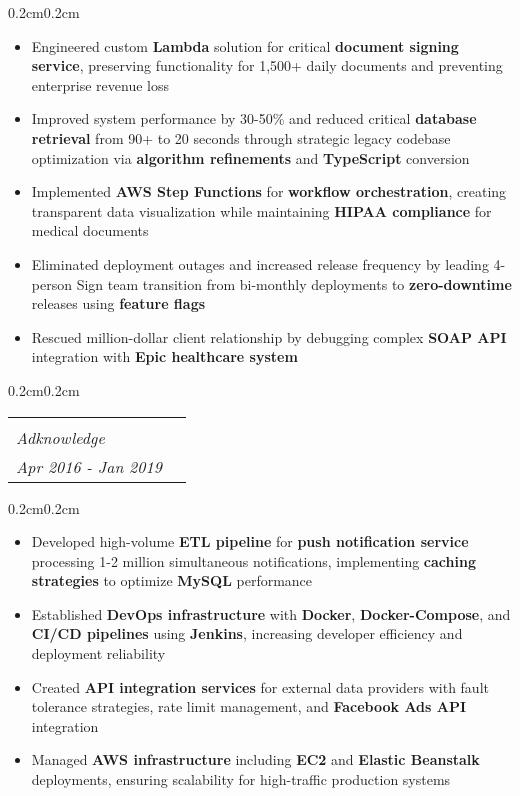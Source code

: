 \documentclass[10pt, letterpaper]{article}
\makeatletter
\newenvironment{highlights}{
    \begin{itemize}[
        topsep=0.10 cm,
        parsep=0.10 cm,
        partopsep=0pt,
        itemsep=0pt,
        leftmargin=0.4 cm + 10pt
    ]
}{
    \end{itemize}
}
\newenvironment{onecolentry}{
    \begin{adjustwidth}{0.2cm}{0.2cm}
}{
    \end{adjustwidth}
}
\newcommand{\jobentry}[4]{
    \begin{onecolentry}
        \noindent
        \begin{tabularx}{\textwidth}{@{}X>{\raggedleft\arraybackslash}p{3cm}@{\hspace{0.2cm}}}
            \begin{tabular}[t]{@{}l@{}}
                \textbf{#1}\\
                \textit{#2}
            \end{tabular} &
            \begin{tabular}[t]{@{}r@{}}
                #4\\
                \textit{#3}
            \end{tabular}
        \end{tabularx}
    \end{onecolentry}
}
\makeatother
\begin{document}
    \vspace{0.10cm}
    \begin{onecolentry}
        \begin{highlights}
            \item Engineered custom \textbf{Lambda} solution for critical \textbf{document signing service}, preserving functionality for 1,500+ daily documents and preventing enterprise revenue loss
            \item Improved system performance by 30-50\% and reduced critical \textbf{database retrieval} from 90+ to 20 seconds through strategic legacy codebase optimization via \textbf{algorithm refinements} and \textbf{TypeScript} conversion
            \item Implemented \textbf{AWS Step Functions} for \textbf{workflow orchestration}, creating transparent data visualization while maintaining \textbf{HIPAA compliance} for medical documents
            \item Eliminated deployment outages and increased release frequency by leading 4-person Sign team transition from bi-monthly deployments to \textbf{zero-downtime} releases using \textbf{feature flags}
            \item Rescued million-dollar client relationship by debugging complex \textbf{SOAP API} integration with \textbf{Epic healthcare system}
        \end{highlights}
    \end{onecolentry}

    \vspace{0.3cm}

    \jobentry{Java Backend Developer}{Adknowledge}{Apr 2016 - Jan 2019}{Kansas City, MO}

    \vspace{0.10cm}
    \begin{onecolentry}
        \begin{highlights}
            \item Developed high-volume \textbf{ETL pipeline} for \textbf{push notification service} processing 1-2 million simultaneous notifications, implementing \textbf{caching strategies} to optimize \textbf{MySQL} performance
            \item Established \textbf{DevOps infrastructure} with \textbf{Docker}, \textbf{Docker-Compose}, and \textbf{CI/CD pipelines} using \textbf{Jenkins}, increasing developer efficiency and deployment reliability
            \item Created \textbf{API integration services} for external data providers with fault tolerance strategies, rate limit management, and \textbf{Facebook Ads API} integration
            \item Managed \textbf{AWS infrastructure} including \textbf{EC2} and \textbf{Elastic Beanstalk} deployments, ensuring scalability for high-traffic production systems
        \end{highlights}
    \end{onecolentry}
\end{document}

